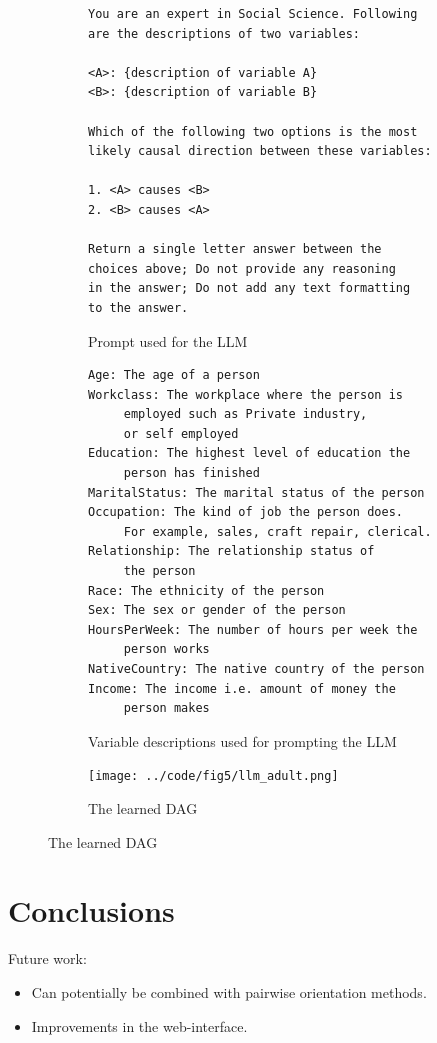 \documentclass{uai2025} %
\begin{document}
\begin{figure}
	\centering
	\begin{subfigure}{0.5\textwidth}
		\begin{Verbatim}[fontsize=\footnotesize]
You are an expert in Social Science. Following
are the descriptions of two variables:

<A>: {description of variable A}
<B>: {description of variable B}

Which of the following two options is the most 
likely causal direction between these variables:

1. <A> causes <B>
2. <B> causes <A>

Return a single letter answer between the 
choices above; Do not provide any reasoning 
in the answer; Do not add any text formatting 
to the answer.
		\end{Verbatim}
	\caption{Prompt used for the LLM}
	\end{subfigure}
	\begin{subfigure}{0.5 \textwidth}
		\begin{Verbatim}[fontsize=\footnotesize]
Age: The age of a person
Workclass: The workplace where the person is 
     employed such as Private industry, 
     or self employed
Education: The highest level of education the 
     person has finished
MaritalStatus: The marital status of the person
Occupation: The kind of job the person does. 
     For example, sales, craft repair, clerical.
Relationship: The relationship status of 
     the person
Race: The ethnicity of the person
Sex: The sex or gender of the person
HoursPerWeek: The number of hours per week the 
     person works
NativeCountry: The native country of the person
Income: The income i.e. amount of money the 
     person makes
		\end{Verbatim}
	\caption{Variable descriptions used for prompting the LLM}
	\end{subfigure}
	\begin{subfigure}{0.5\textwidth}
		\centering
		\texttt{[image: ../code/fig5/llm\_adult.png]}
		\caption{The learned DAG}
	\end{subfigure}
\end{figure}

\section{Conclusions}
Future work:
\begin{itemize}
	\item Can potentially be combined with pairwise orientation methods.
	\item Improvements in the web-interface.
\end{itemize}

\newpage

\end{document}
